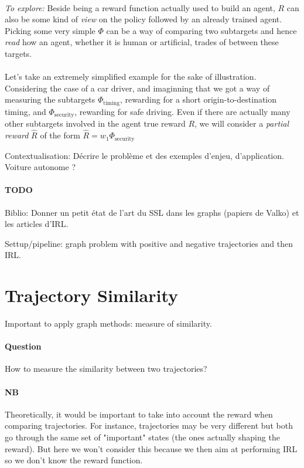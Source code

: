 \documentclass{article}
\begin{document}
\paragraph{}
\emph{To explore:} Beside being a reward function actually used to build an agent, $R$ can also be some kind of \emph{view} on the policy followed by an already trained agent. Picking some very simple $\Phi$ can be a way of comparing two subtargets and hence \emph{read} how an agent, whether it is human or artificial, trades of between these targets.

\paragraph{}
Let's take an extremely simplified example for the sake of illustration. Considering the case of a car driver, and imaginning that we got a way of measuring the subtargets $\Phi_{\text{timing}}$, rewarding for a short origin-to-destination timing, and $\Phi_{\text{security}}$, rewarding for safe driving. Even if there are actually many other subtargets involved in the agent true reward $R$, we will consider a \emph{partial reward} $\hat R$ of the form $\hat R = w_1 \Phi_{\text{security}}$

Contextualisation: Décrire le problème et des exemples d'enjeu, d'application. Voiture autonome ?

\paragraph{TODO} Biblio: Donner un petit état de l'art du SSL dans les graphs (papiers de Valko) et les articles d'IRL.

Settup/pipeline: graph problem with positive and negative trajectories and then IRL.

\section{Trajectory Similarity}

Important to apply graph methods: measure of similarity.

\paragraph{Question}
How to measure the similarity between two trajectories?

\paragraph{NB} Theoretically, it would be important to take into account the reward when comparing trajectories. For instance, trajectories may be very different but both go through the same set of "important" states (the ones actually shaping the reward). But here we won't consider this because we then aim at performing IRL so we don't know the reward function.
\end{document}
